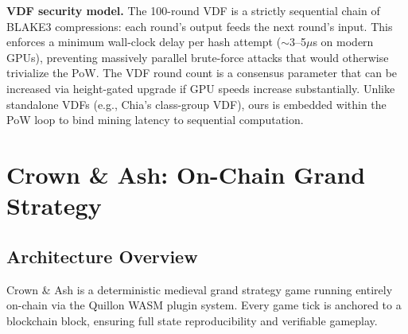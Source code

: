 \documentclass[11pt,a4paper]{article}
\begin{document}
\noindent\textbf{VDF security model.} The 100-round VDF is a strictly sequential chain of BLAKE3 compressions: each round's output feeds the next round's input. This enforces a minimum wall-clock delay per hash attempt ($\sim$3--5$\mu$s on modern GPUs), preventing massively parallel brute-force attacks that would otherwise trivialize the PoW. The VDF round count is a consensus parameter that can be increased via height-gated upgrade if GPU speeds increase substantially. Unlike standalone VDFs (e.g., Chia's class-group VDF), ours is embedded within the PoW loop to bind mining latency to sequential computation.

\section{Crown \& Ash: On-Chain Grand Strategy}

\subsection{Architecture Overview}

Crown \& Ash is a deterministic medieval grand strategy game running entirely on-chain via the Quillon WASM plugin system. Every game tick is anchored to a blockchain block, ensuring full state reproducibility and verifiable gameplay.
\end{document}

